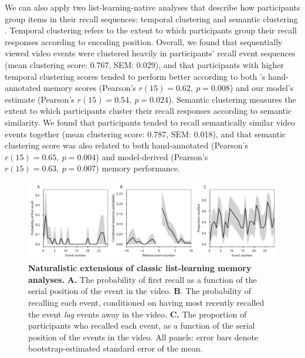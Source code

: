 \documentclass{article}
\begin{document}
We can also apply two list-learning-native analyses that describe how participants group items in their recall sequences: temporal clustering and semantic clustering \citep[][see \textit{Methods} for details]{PolyEtal09}.  Temporal clustering refers to the extent to which participants group their recall responses according to encoding position.  Overall, we found that sequentially viewed video events were clustered heavily in participants' recall event sequences (mean clustering score: 0.767, SEM: 0.029), and that participants with higher temporal clustering scores tended to perform better according to both \cite{ChenEtal17}'s hand-annotated memory scores (Pearson's $r(15) = 0.62,~p = 0.008$) and our model's estimate (Pearson's $r(15) = 0.54,~p = 0.024$).  Semantic clustering measures the extent to which participants cluster their recall responses according to semantic similarity.  We found that participants tended to recall semantically similar video events together (mean clustering score: 0.787, SEM: 0.018), and that semantic clustering score was also related to both hand-annotated  (Pearson's $r(15) = 0.65,~p = 0.004$) and model-derived (Pearson's $r(15) = 0.63,~p = 0.007$) memory performance.

\begin{figure}[t]
  \centering
  \includegraphics[width=1\textwidth]{figs/list_learning}
  \caption{\small \textbf{Naturalistic extensions of classic list-learning memory analyses.} \textbf{A.} The probability of first recall as a function of the serial position of the event in the video. \textbf{B}.  The probability of recalling each event, conditioned on having most recently recalled the event \textit{lag} events away in the video.  \textbf{C.} The proportion of participants who recalled each event, as a function of the serial position of the events in the video.  All panels: error bars denote bootstrap-estimated standard error of the mean.}
  \label{fig:list-learning}
\end{figure}
\end{document}
